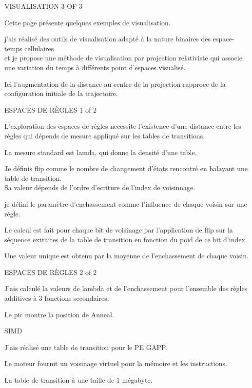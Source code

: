 \documentclass[a4paper]{slides}
\newcommand{\mytitle}[1]{\begin{center}\begin{large}#1\end{large}\end{center}}
\begin{document}
\begin{slide}
  \mytitle{VISUALISATION 3 OF 3}
  Cette page pr\'esente quelques exemples de visualisation.
  
  j'ais r\'ealis\'e des outils de visualisation adapt\'e \`a la nature
  binaires des espace-temps cellulaires\\ et je propose une m\'ethode de
  visualisation par projection relativiste qui associe une variation
  du temps \`a diff\'erents point d'espaces visualis\'e.

  Ici l'augmentation de la distance au centre de la projection
  rapproce de la configuration initiale de la trajectoire.
\end{slide}

\begin{slide}
  \mytitle{ESPACES DE R\`EGLES 1 of 2}
  L'exploration des espaces de r\`egles necessite l'existence d'une
  distance entre les r\`egles qui d\'epends de mesure appliqu\'e sur les
  tables de transitions.
  
  La mesure standard est lamda, qui donne la densit\'e d'une table.
  
  Je d\'efinis flip comme le nombre de changement d'\'etats rencontr\'e en
  balayant une table de transition.\\
  Sa valeur d\'epends de l'ordre d'ecriture de l'index de voisinnage.
  
  je d\'efini le param\`etre d'enchassement comme l'influence de chaque
  voisin sur une r\`egle.
  
  Le calcul est fait pour chaque bit de voisinage par l'application de
  flip sur la s\'equence extraites de la table de transition en fonction
  du poid de ce bit d'index.
  
  Une valeur unique est obtenu par la moyenne de l'enchassement de
  chaque voisin.
\end{slide}

\begin{slide}
  \mytitle{ESPACES DE R\`EGLES 2 of 2}
  J'ais calcul\'e la valeurs de lambda et de l'enchassement pour
  l'ensemble des r\`egles additives \`a 3 fonctions secondaires.
  
  Le pic montre la position de Anneal.
\end{slide}

\begin{slide}
  \mytitle{SIMD}
  J'ais r\'ealis\'e une table de transition pour le PE GAPP.
  
  Le moteur fournit un voisinage virtuel pour la m\'emoire et les
  instructions.
  
  La table de transition \`a une taille de 1 m\'egabyte.
\end{slide}
\end{document}
